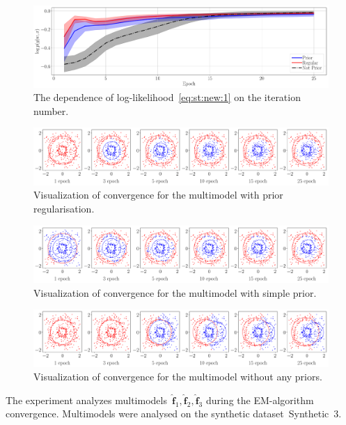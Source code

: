 \documentclass[12pt, twoside]{article}
\numberwithin{equation}{section}
\begin{document}
\begin{figure}[h!t]\center
\includegraphics[width=1\textwidth]{result_eng/experiment_synt_likelihood_progress}
\caption{The dependence of log-likelihood~\eqref{eq:st:new:1} on the iteration number.}
\label{experiment:st:2:2}
\end{figure}

\begin{figure}[h!t]\center
\includegraphics[width=1\textwidth]{result_eng/experiment_synt_regular_progress}
\caption{Visualization of convergence for the multimodel with prior regularisation.}
\label{experiment:st:2:3}
\end{figure}

\begin{figure}[h!t]\center
\includegraphics[width=1\textwidth]{result_eng/experiment_synt_prior_progress}
\caption{Visualization of convergence for the multimodel with simple prior.}
\label{experiment:st:2:4}
\end{figure}

\begin{figure}[h!t]\center
\includegraphics[width=1\textwidth]{result_eng/experiment_synt_not_prior_progress}
\caption{Visualization of convergence for the multimodel without any priors.}
\label{experiment:st:2:5}
\end{figure}
The experiment analyzes multimodels~$\hat{\mathbf{f}}_1, \hat{\mathbf{f}}_2, \hat{\mathbf{f}}_3$ during the EM-algorithm convergence. Multimodels were analysed on the synthetic dataset~Synthetic~3.
\end{document}
